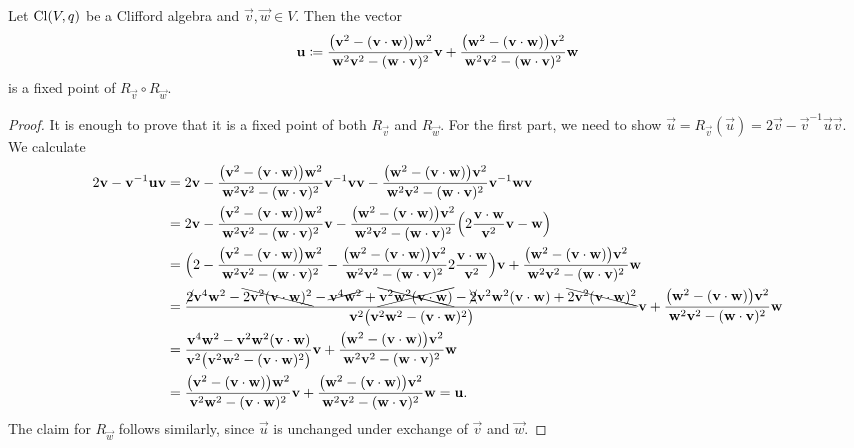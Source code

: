 \begin{lemma}
Let $\Cl(V,q)$ be a Clifford algebra and $\vec{v}, \vec{w}\in V$. Then the vector
\[ \vec{u} \defeq \frac{\big(\vec{v}^2 - (\vec{v}\cdot \vec{w})\big)\vec{w}^2}{\vec{w}^2 \vec{v}^2 - (\vec{w}\cdot \vec{v})^2}\vec{v} + \frac{\big(\vec{w}^2 - (\vec{v}\cdot \vec{w})\big)\vec{v}^2}{\vec{w}^2 \vec{v}^2 - (\vec{w}\cdot \vec{v})^2}\vec{w} \]
is a fixed point of $R_{\vec{v}}\circ R_{\vec{w}}$.
\end{lemma}
\begin{proof}
It is enough to prove that it is a fixed point of both $R_{\vec{v}}$ and $R_{\vec{w}}$. For the first part, we need to show $\vec{u} = R_{\vec{v}}(\vec{u}) = 2 \vec{v} - \vec{v}^{-1}\vec{u}\vec{v}$.
We calculate
\begin{align*}
2 \vec{v} - \vec{v}^{-1} \vec{u}\vec{v} &= 2 \vec{v} - \frac{\big(\vec{v}^2 - (\vec{v}\cdot \vec{w})\big)\vec{w}^2}{\vec{w}^2 \vec{v}^2 - (\vec{w}\cdot \vec{v})^2}\vec{v}^{-1}\vec{v}\vec{v} - \frac{\big(\vec{w}^2 - (\vec{v}\cdot \vec{w})\big)\vec{v}^2}{\vec{w}^2 \vec{v}^2 - (\vec{w}\cdot \vec{v})^2}\vec{v}^{-1} \vec{w}\vec{v} \\
&= 2 \vec{v} - \frac{\big(\vec{v}^2 - (\vec{v}\cdot \vec{w})\big)\vec{w}^2}{\vec{w}^2 \vec{v}^2 - (\vec{w}\cdot \vec{v})^2}\vec{v} - \frac{\big(\vec{w}^2 - (\vec{v}\cdot \vec{w})\big)\vec{v}^2}{\vec{w}^2 \vec{v}^2 - (\vec{w}\cdot \vec{v})^2}\Big(2 \frac{\vec{v}\cdot \vec{w}}{\vec{v}^2}\vec{v} - \vec{w}\Big) \\
&= \Big(2 - \frac{\big(\vec{v}^2 - (\vec{v}\cdot \vec{w})\big)\vec{w}^2}{\vec{w}^2 \vec{v}^2 - (\vec{w}\cdot \vec{v})^2} - \frac{\big(\vec{w}^2 - (\vec{v}\cdot \vec{w})\big)\vec{v}^2}{\vec{w}^2 \vec{v}^2 - (\vec{w}\cdot \vec{v})^2}2 \frac{\vec{v}\cdot \vec{w}}{\vec{v}^2}\Big)\vec{v} + \frac{\big(\vec{w}^2 - (\vec{v}\cdot \vec{w})\big)\vec{v}^2}{\vec{w}^2 \vec{v}^2 - (\vec{w}\cdot \vec{v})^2}\vec{w} \\
&= \frac{\cancel{2} \vec{v}^4 \vec{w}^2 - \bcancel{2 \vec{v}^2 (\vec{v}\cdot \vec{w})^2} - \cancel{\vec{v}^4 \vec{w}^2} + \xcancel{\vec{v}^2 \vec{w}^2(\vec{v}\cdot \vec{w})} - \xcancel{2}\vec{v}^2\vec{w}^2(\vec{v}\cdot \vec{w}) + \bcancel{2\vec{v}^2 (\vec{v}\cdot \vec{w})^2}}{\vec{v}^2\big(\vec{v}^2 \vec{w}^2 - (\vec{v}\cdot \vec{w})^2\big)}\vec{v} + \frac{\big(\vec{w}^2 - (\vec{v}\cdot \vec{w})\big)\vec{v}^2}{\vec{w}^2 \vec{v}^2 - (\vec{w}\cdot \vec{v})^2}\vec{w} \\
&= \frac{\vec{v}^4 \vec{w}^2 - \vec{v}^2\vec{w}^2(\vec{v}\cdot \vec{w})}{\vec{v}^2\big(\vec{v}^2 \vec{w}^2 - (\vec{v}\cdot \vec{w})^2\big)}\vec{v} + \frac{\big(\vec{w}^2 - (\vec{v}\cdot \vec{w})\big)\vec{v}^2}{\vec{w}^2 \vec{v}^2 - (\vec{w}\cdot \vec{v})^2}\vec{w} \\
&= \frac{\big(\vec{v}^2 - (\vec{v}\cdot \vec{w})\big)\vec{w}^2}{\vec{v}^2 \vec{w}^2 - (\vec{v}\cdot \vec{w})^2}\vec{v} + \frac{\big(\vec{w}^2 - (\vec{v}\cdot \vec{w})\big)\vec{v}^2}{\vec{w}^2 \vec{v}^2 - (\vec{w}\cdot \vec{v})^2}\vec{w} = \vec{u}.
\end{align*}
The claim for $R_{\vec{w}}$ follows similarly, since $\vec{u}$ is unchanged under exchange of $\vec{v}$ and $\vec{w}$.
\end{proof}


